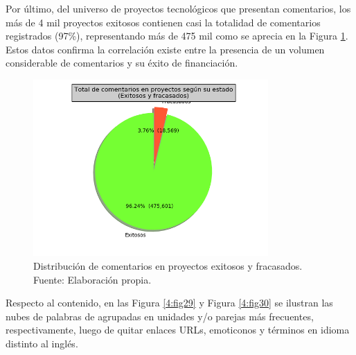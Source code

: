 Por último, del universo de proyectos tecnológicos que presentan comentarios, los más de 4 mil proyectos exitosos contienen casi la totalidad de comentarios registrados (97\%), representando más de 475 mil como se aprecia en la Figura \ref{4:fig28}. Estos datos confirma la correlación existe entre la presencia de un volumen considerable de comentarios y su éxito de financiación.

\begin{figure}[!ht]
	\begin{center}
		\includegraphics[width=0.8\textwidth]{4/figures/total comments by projects state.png}
		\caption{Distribución de comentarios en proyectos exitosos y fracasados. Fuente: Elaboración propia.}
		\label{4:fig28}
	\end{center}
\end{figure}

Respecto al contenido, en las Figura \ref{4:fig29} y Figura \ref{4:fig30} se ilustran las nubes de palabras de agrupadas en unidades y/o parejas más frecuentes, respectivamente, luego de quitar enlaces URLs, emoticonos y términos en idioma distinto al inglés.


